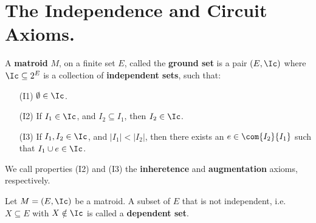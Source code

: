 
\section{The Independence and Circuit Axioms.}

\begin{definition}
    A \textbf{matroid} $M$, on a finite set $E$, called the \textbf{ground set}
    is  a pair $(E,\Ic)$ where $\Ic \subseteq 2^E$ is a collection of
    \textbf{independent sets}, such that:
    \begin{enumerate}
        \item[(I1)] $\emptyset \in \Ic$.

        \item [(I2)] If $I_1 \in \Ic$, and  $I_2 \subseteq I_1$, then  $I_2 \in
            \Ic$.

        \item[(I3)] If $I_1,I_2 \in \Ic$, and  $|I_1|<|I_2|$, then there exists
            an  $e \in \com{{I_2}}{I_1}$ such that $I_1 \cup e \in \Ic$.
    \end{enumerate}
    We call properties (I2) and (I3) the \textbf{inheretence} and
    \textbf{augmentation} axioms, respectively.
\end{definition}

\begin{definition}
    Let $M=(E,\Ic)$ be a matroid. A subset of $E$ that is not independent, i.e.
    $X \subseteq E$ with  $X \notin \Ic$ is called a \textbf{dependent set}.
\end{definition}

